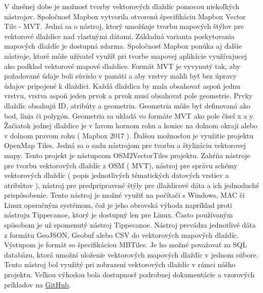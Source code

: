 \documentclass[12pt]{article}
\begin{document}
 V dnešnej dobe je možnosť tvorby vektorových dlaždíc pomocou niekoľkých nástrojov. 
\newline Spoločnosť Mapbox vytvorila otvorenú špecifikáciu Mapbox Vector Tile - MVT. Jedná sa o nástroj, ktorý umožňuje tvorbu mapových štýlov pre vektorové dlaždice nad vlastnými dátami. Základná varianta poskytovania mapových dlaždíc je dostupná zdarma. Spoločnosť Mapbox ponúka aj ďalšie nástroje, ktoré môže užívateľ využíť pri tvorbe mapovej aplikácie využívajucej ako podklad vektorové mapové dlaždice. Formát MVT je vyvynutý tak, aby požadované údaje boli súvislo v pamäti a aby vrstvy mahli byť bez úpravy údajov pripojené k dlaždici. Každá dlaždica by mala obsahovať aspoň jednu vrstvu, vrstva aspoň jeden prvok a prvok musí obsahovať pole geometrie. Prvky dlaždíc obsahujú ID, atribúty a geometriu. Geometria môže byť definovaná ako bod, línia či polygón. Geometria sa ukladá vo formáte MVT ako pole čísel x a y. Žačiatok jednej dlaždice je  v ľavom hornom rohu a koniec na dolnom okraji alebo v dolnom pravom rohu ( Mapbox 2017 ).
\newline Ďalšou možnosťou je využitie projektu OpenMap Tiles. Jedná sa o sadu nástrojom pre tvorbu a štylizáciu vektorovej mapy. Tento projekt je nástupcom OSM2VectorTiles projektu. Zahŕňa nástroje pre tvorbu vektorových dlaždíc z OSM ( MVT), nástroj pre správu schémy vektorových dlaždíc ( popis jednotlivých tématických datových vrstiev a atribútov ), nástroj pre predpripravené štýly pre dlaždicové dáta a ich jednoduché prispôsobenie. Tento nástroj je možné využiť na počítači s Windows, MAC či Linux operačným systémom, čož je jeho obrovská výhoda napríklad proti nástroju Tippecanoe, ktorý je dostupný len pre Linux.  
\newline Často používaným spôsobom je už spomenutý nástroj Tippecanoe. Nástroj prevádza jednotlivé dáta z formátu GeoJSON, Geobuf alebo CSV do vektorových mapových dlaždíc. Výstupom je formát so špecifikáciou MBTiles. Je ho možné považovať za SQL databázu, ktorá umožní uloženie vektorových mapových dlaždíc v jednom súbore. Tento nástroj bol využitý pri zobrazení vektorových dlaždíc v rámci nášho projektu. Veľkou výhodou bola dostupnosť podrobnej dokumentácie a vzorových príkladov na  \href{https://github.com/mapbox/tippecanoe}{ GitHub}.
\end{document}
